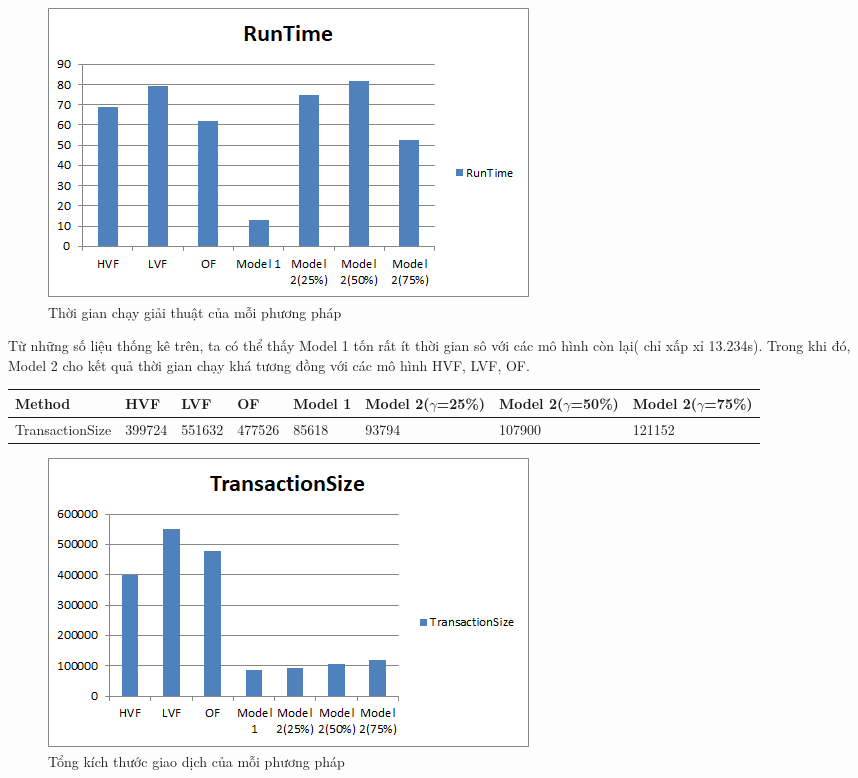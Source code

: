 \documentclass[a4paper]{article}
\begin{document}
\begin{center}
	\begin{figure} [ht]
		\begin{center}
			\includegraphics[scale=1]{RunTime}
		\end{center}
		\caption{Thời gian chạy giải thuật của mỗi phương pháp}
		\label{refhinh1}
	\end{figure}
\end{center}

Từ những số liệu thống kê trên, ta có thể thấy Model 1 tốn rất ít thời gian sô với các mô hình còn lại( chỉ xấp xỉ 13.234s). Trong khi đó, Model 2 cho kết quả thời gian chạy khá tương đồng với các mô hình HVF, LVF, OF.

\begin{table}[ht]
	\begin{tabular}{|l|l|l|l|l|l|l|l|}
		\hline
		Method  & HVF & LVF & OF & Model 1 & Model 2($\gamma$=25\%) & Model 2($\gamma$=50\%) & Model 2($\gamma$=75\%) \\ \hline
		TransactionSize & 399724 & 551632 & 477526 & 85618   & 93794         & 107900        & 121152        \\ \hline
	\end{tabular}
\end{table}

\begin{center}
	\begin{figure}[!ht]
		\begin{center}
			\includegraphics[scale=1]{TransactionSize}
		\end{center}
		\caption{Tổng kích thước giao dịch của mỗi phương pháp}
		\label{refhinh1}
	\end{figure}
\end{center}
\end{document}

